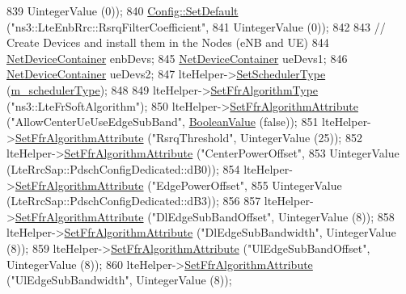 \begin{DoxyCode}
839                       UintegerValue (0));
840   \hyperlink{group__config_ga2e7882df849d8ba4aaad31c934c40c06}{Config::SetDefault} (\textcolor{stringliteral}{"ns3::LteEnbRrc::RsrqFilterCoefficient"},
841                       UintegerValue (0));
842 
843   \textcolor{comment}{// Create Devices and install them in the Nodes (eNB and UE)}
844   \hyperlink{classns3_1_1NetDeviceContainer}{NetDeviceContainer} enbDevs;
845   \hyperlink{classns3_1_1NetDeviceContainer}{NetDeviceContainer} ueDevs1;
846   \hyperlink{classns3_1_1NetDeviceContainer}{NetDeviceContainer} ueDevs2;
847   lteHelper->\hyperlink{classns3_1_1LteHelper_a8f86e55b8b80a81732c4b2df00fb25d5}{SetSchedulerType} (\hyperlink{classLteFrAreaTestCase_aa093fda7c4b63732d547c87952f52f05}{m\_schedulerType});
848 
849   lteHelper->\hyperlink{classns3_1_1LteHelper_a035c6b03305c1511975362f80425b5fc}{SetFfrAlgorithmType} (\textcolor{stringliteral}{"ns3::LteFrSoftAlgorithm"});
850   lteHelper->\hyperlink{classns3_1_1LteHelper_a793d56e843a844428851e90752c5f130}{SetFfrAlgorithmAttribute} (\textcolor{stringliteral}{"AllowCenterUeUseEdgeSubBand"}, 
      \hyperlink{classns3_1_1BooleanValue}{BooleanValue} (\textcolor{keyword}{false}));
851   lteHelper->\hyperlink{classns3_1_1LteHelper_a793d56e843a844428851e90752c5f130}{SetFfrAlgorithmAttribute} (\textcolor{stringliteral}{"RsrqThreshold"}, UintegerValue (25));
852   lteHelper->\hyperlink{classns3_1_1LteHelper_a793d56e843a844428851e90752c5f130}{SetFfrAlgorithmAttribute} (\textcolor{stringliteral}{"CenterPowerOffset"},
853                                        UintegerValue (LteRrcSap::PdschConfigDedicated::dB0));
854   lteHelper->\hyperlink{classns3_1_1LteHelper_a793d56e843a844428851e90752c5f130}{SetFfrAlgorithmAttribute} (\textcolor{stringliteral}{"EdgePowerOffset"},
855                                        UintegerValue (LteRrcSap::PdschConfigDedicated::dB3));
856 
857   lteHelper->\hyperlink{classns3_1_1LteHelper_a793d56e843a844428851e90752c5f130}{SetFfrAlgorithmAttribute} (\textcolor{stringliteral}{"DlEdgeSubBandOffset"}, UintegerValue (8));
858   lteHelper->\hyperlink{classns3_1_1LteHelper_a793d56e843a844428851e90752c5f130}{SetFfrAlgorithmAttribute} (\textcolor{stringliteral}{"DlEdgeSubBandwidth"}, UintegerValue (8));
859   lteHelper->\hyperlink{classns3_1_1LteHelper_a793d56e843a844428851e90752c5f130}{SetFfrAlgorithmAttribute} (\textcolor{stringliteral}{"UlEdgeSubBandOffset"}, UintegerValue (8));
860   lteHelper->\hyperlink{classns3_1_1LteHelper_a793d56e843a844428851e90752c5f130}{SetFfrAlgorithmAttribute} (\textcolor{stringliteral}{"UlEdgeSubBandwidth"}, UintegerValue (8));

\end{DoxyCode}
